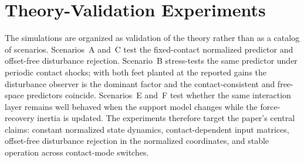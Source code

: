 \begin{table}[!t]
\caption{Architectural and Mathematical Comparison}
\label{tab:comparison}
\renewcommand{\arraystretch}{1.3}
\end{table}

\section{Theory-Validation Experiments}\label{sec:simulation}

The simulations are organized as validation of the theory rather than as a
catalog of scenarios. Scenarios~A and~C test the fixed-contact normalized
predictor and offset-free disturbance rejection. Scenario~B stress-tests the
same predictor under periodic contact shocks; with both feet planted at the
reported gains the disturbance observer is the dominant factor and the
contact-consistent and free-space predictors coincide. Scenarios~E and~F test
whether the same interaction layer remains well behaved when the support model
changes while the force-recovery inertia is updated. The
experiments therefore target the paper's central claims: constant normalized
state dynamics, contact-dependent input matrices, offset-free disturbance
rejection in the normalized coordinates, and stable operation across
contact-mode switches.

